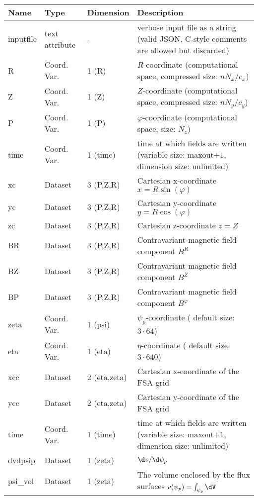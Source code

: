 \begin{longtable}{lll>{\RaggedRight}p{7cm}}
\toprule
\rowcolor{gray!50}\textbf{Name} &  \textbf{Type} & \textbf{Dimension} & \textbf{Description}  \\ \midrule
inputfile  &     text attribute & - & verbose input file as a string (valid JSON, C-style comments are allowed but discarded) \\
R                & Coord. Var. & 1 (R) & $R$-coordinate (computational space, compressed size: $nN_x/c_x$)\\
Z                & Coord. Var. & 1 (Z) & $Z$-coordinate (computational space, compressed size: $nN_y/c_y$)\\
P                & Coord. Var. & 1 (P) & $\varphi$-coordinate (computational space, size: $N_z$) \\
time             & Coord. Var. & 1 (time)& time at which fields are written (variable size: maxout$+1$, dimension size: unlimited) \\
xc           & Dataset & 3 (P,Z,R) & Cartesian x-coordinate $x=R\sin(\varphi)$ \\
yc           & Dataset & 3 (P,Z,R) & Cartesian y-coordinate $y=R\cos(\varphi)$\\
zc           & Dataset & 3 (P,Z,R) & Cartesian z-coordinate $z=Z$ \\
BR               & Dataset & 3 (P,Z,R) & Contravariant magnetic field component $B^R$ \\
BZ               & Dataset & 3 (P,Z,R) & Contravariant magnetic field component $B^Z$ \\
BP               & Dataset & 3 (P,Z,R) & Contravariant magnetic field component $B^\varphi$ \\
zeta             & Coord. Var. & 1 (psi) & $\psi_p$-coordinate ( default size: $3\cdot 64$) \\
eta              & Coord. Var. & 1 (eta) & $\eta$-coordinate ( default size: $3\cdot 640$) \\
xcc              & Dataset & 2 (eta,zeta) & Cartesian x-coordinate of the FSA grid \\
ycc              & Dataset & 2 (eta,zeta) & Cartesian y-coordinate of the FSA grid\\
time             & Coord. Var. & 1 (time)& time at which fields are written (variable size: maxout$+1$, dimension size: unlimited) \\
dvdpsip          & Dataset & 1 (zeta) & $\d v/\d\psi_p$ \\
psi\_vol         & Dataset & 1 (zeta) & The volume enclosed by the flux surfaces $v(\psi_p) = \int_{\psi_p} \dV $ \\

\end{longtable}
